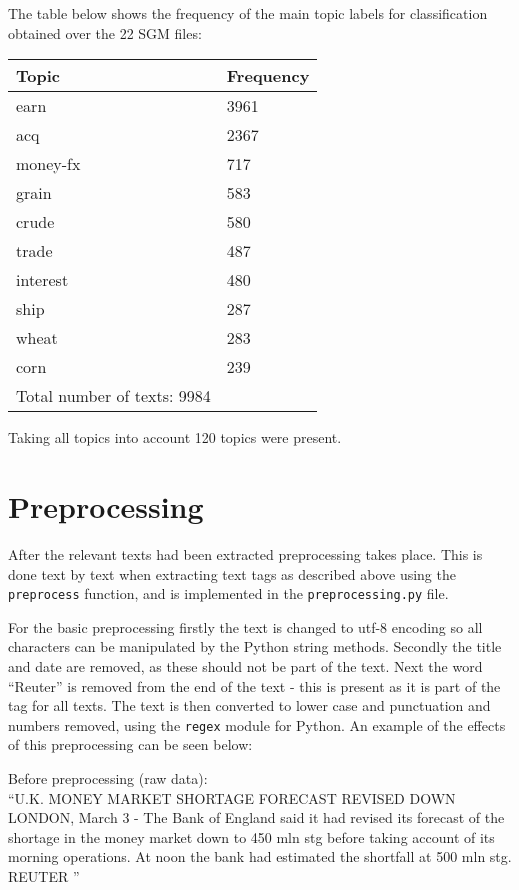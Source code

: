\documentclass{article}
\begin{document}
The table below shows the frequency of the main topic labels for classification obtained over the 22 SGM files:
\\
\begin{center}
\begin{tabular}{l | l}
Topic & Frequency \\ \hline
earn & 3961 \\
acq & 2367 \\
money-fx & 717 \\
grain & 583 \\
crude & 580 \\
trade & 487 \\
interest & 480 \\
ship & 287 \\
wheat & 283 \\
corn & 239 \\ \hline
Total number of texts: 9984 \\
\end{tabular}
\end{center}

Taking all topics into account 120 topics were present.

\section{Preprocessing}
After the relevant texts had been extracted preprocessing takes place. This is done text by text when extracting text tags as described above using the \verb|preprocess| function, and is implemented in the \verb|preprocessing.py| file.

For the basic preprocessing firstly the text is changed to utf-8 encoding so all characters can be manipulated by the Python string methods. Secondly the title and date are removed, as these should not be part of the text. Next the word ``Reuter'' is removed from the end of the text - this is present as it is part of the tag for all texts. The text is then converted to lower case and punctuation and numbers removed, using the \verb|regex| module for Python. An example of the effects of this preprocessing can be seen below:

Before preprocessing (raw data):
\\``U.K. MONEY MARKET SHORTAGE FORECAST REVISED DOWN
    LONDON, March 3 - The Bank of England said it had revised
its forecast of the shortage in the money market down to 450
mln stg before taking account of its morning operations. At
noon the bank had estimated the shortfall at 500 mln stg.
 REUTER
''
\end{document}
